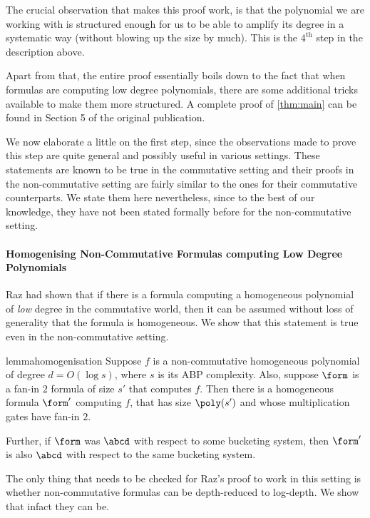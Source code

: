 \noindent The crucial observation that makes this proof work, is that the polynomial we are working with is structured enough for us to be able to amplify its degree in a systematic way (without blowing up the size by much).
This is the $4^{\text{th}}$ step in the description above.

Apart from that, the entire proof essentially boils down to the fact that when formulas are computing low degree polynomials, there are some additional tricks available to make them more structured.
A complete proof of \autoref{thm:main} can be found in Section 5 of the original publication.

We now elaborate a little on the first step, since the observations made to prove this step are quite general and possibly useful in various settings.
These statements are known to be true in the commutative setting and their proofs in the non-commutative setting are fairly similar to the ones for their commutative counterparts.
We state them here nevertheless, since to the best of our knowledge, they have not been stated formally before for the non-commutative setting.

\paragraph*{Homogenising Non-Commutative Formulas computing Low Degree Polynomials}

Raz \cite{R13} had shown that if there is a formula computing a homogeneous polynomial of \emph{low} degree in the commutative world, then it can be assumed without loss of generality that the formula is homogeneous.
We show that this statement is true even in the non-commutative setting. 

\begin{restatable}{lemma}{homogenisation}\label{lem:homogenisation}
	Suppose $f$ is a non-commutative homogeneous polynomial of degree $d = O(\log s)$, where $s$ is its ABP complexity. 
	Also, suppose $\form$ is a fan-in $2$ formula of size $s'$ that computes $f$.
	Then there is a homogeneous formula $\form'$ computing $f$, that has size $\poly(s')$ and whose multiplication gates have fan-in $2$.

	Further, if $\form$ was $\abcd$ with respect to some bucketing system, then $\form'$ is also $\abcd$ with respect to the same bucketing system.
\end{restatable}

The only thing that needs to be checked for Raz's proof to work in this setting is whether non-commutative formulas can be depth-reduced to log-depth.
We show that infact they can be.

